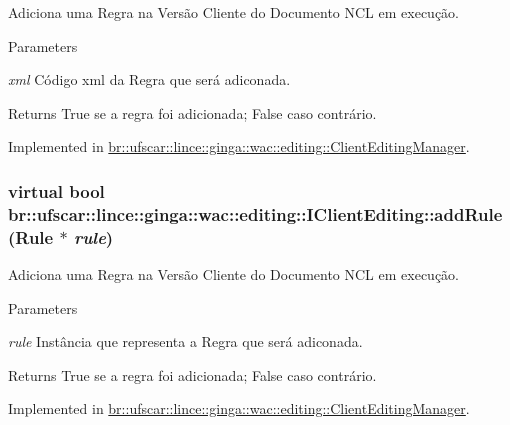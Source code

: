 Adiciona uma Regra na Versão Cliente do Documento NCL em execução. 


\begin{DoxyParams}{Parameters}
\item[{\em xml}]Código xml da Regra que será adiconada. \end{DoxyParams}
\begin{DoxyReturn}{Returns}
True se a regra foi adicionada; False caso contrário. 
\end{DoxyReturn}


Implemented in \hyperlink{classbr_1_1ufscar_1_1lince_1_1ginga_1_1wac_1_1editing_1_1ClientEditingManager_abbf0ba0c717c55996fac349a88f78b6f}{br::ufscar::lince::ginga::wac::editing::ClientEditingManager}.

\hypertarget{classbr_1_1ufscar_1_1lince_1_1ginga_1_1wac_1_1editing_1_1IClientEditing_abc156e111b7741a7f55c28b835614178}{
\subsubsection[{addRule}]{\setlength{\rightskip}{0pt plus 5cm}virtual bool br::ufscar::lince::ginga::wac::editing::IClientEditing::addRule (Rule $\ast$ {\em rule})}}
\label{classbr_1_1ufscar_1_1lince_1_1ginga_1_1wac_1_1editing_1_1IClientEditing_abc156e111b7741a7f55c28b835614178}


Adiciona uma Regra na Versão Cliente do Documento NCL em execução. 


\begin{DoxyParams}{Parameters}
\item[{\em rule}]Instância que representa a Regra que será adiconada. \end{DoxyParams}
\begin{DoxyReturn}{Returns}
True se a regra foi adicionada; False caso contrário. 
\end{DoxyReturn}


Implemented in \hyperlink{classbr_1_1ufscar_1_1lince_1_1ginga_1_1wac_1_1editing_1_1ClientEditingManager_a21f7109da6d0eb0b54629547513ff69e}{br::ufscar::lince::ginga::wac::editing::ClientEditingManager}.

